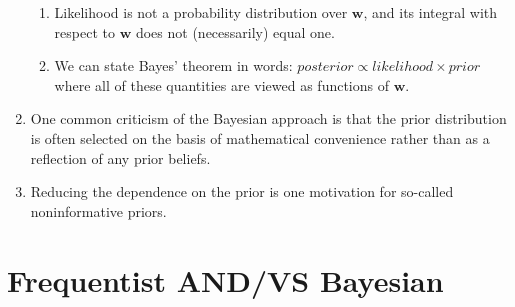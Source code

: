 \begin{enumerate}
\begin{enumerate}
        \item Likelihood is not a probability distribution over $\bm{w}$, and its integral with respect to $\bm{w}$ does not (necessarily) equal one.
        \hfill \cite{ml/book/Pattern-Recognition-And-Machine-Learning/Christopher-M-Bishop}

        \item We can state Bayes’ theorem in words:
        $
            posterior \propto likelihood \times prior
        $
        where all of these quantities are viewed as functions of $\bm{w}$.
        \hfill \cite{ml/book/Pattern-Recognition-And-Machine-Learning/Christopher-M-Bishop}
    \end{enumerate}

    \item One common criticism of the Bayesian approach is that the prior distribution is often selected on the basis of mathematical convenience rather than as a reflection of any prior beliefs.
    \hfill \cite{ml/book/Pattern-Recognition-And-Machine-Learning/Christopher-M-Bishop}

    \item Reducing the dependence on the prior is one motivation for so-called noninformative priors.
    \hfill \cite{ml/book/Pattern-Recognition-And-Machine-Learning/Christopher-M-Bishop}
\end{enumerate}








\section{Frequentist AND/VS Bayesian}

